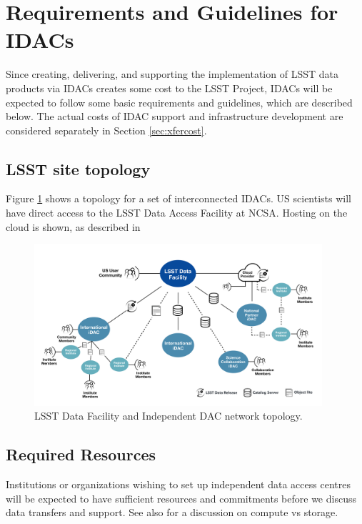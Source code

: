 \section{Requirements and Guidelines for IDACs}\label{sec:reqs}
Since creating, delivering, and supporting the implementation of LSST data products via IDACs creates some cost to the LSST Project, IDACs will be expected to follow some basic requirements and guidelines, which are described below.
The actual costs of IDAC support and infrastructure development are considered separately in Section \ref{sec:xfercost}.

\subsection{LSST site topology} \label{sec:topology}

Figure \ref{fig:idac-topology} shows a  topology for a set of interconnected IDACs.  US scientists will have direct access to the LSST Data Access Facility at NCSA.  Hosting on the cloud is shown, as described in

\begin{figure}
\begin{center}
\includegraphics[width=0.95\textwidth]{images_local/idac-topology}
\caption{LSST Data Facility and Independent DAC network topology.  \label{fig:idac-topology}}
\end{center}
\end{figure}

\subsection{Required Resources} \label{sec:resources}
Institutions or organizations wishing to set up independent data access centres will be expected to have
sufficient resources and commitments before we discuss data transfers and support.
See also  for a discussion on compute vs storage.

